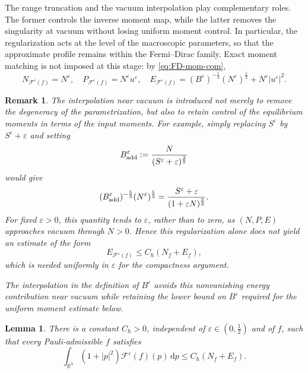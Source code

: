 \documentclass[10pt,reqno]{amsart}
\numberwithin{equation}{section}
\newtheorem{lemma}{Lemma}[section]
\newtheorem{remark}{Remark}[section]
\theoremstyle{definition}
\newcommand{\R}{\mathbb R}
\newcommand{\dpp}{\mathrm{d}p}
\newcommand{\be}{B^{\varepsilon}}
\newcommand{\e}{\varepsilon}
\newcommand{\calF}{\mathcal F}
\newcommand{\bq}{\begin{equation}}
\newcommand{\eq}{\end{equation}}
\begin{document}
The range truncation and the vacuum interpolation play complementary roles. The former controls the inverse moment map, while the latter removes the singularity at vacuum without losing uniform moment control. In particular, the regularization acts at the level of the macroscopic parameters, so that the approximate profile remains within the Fermi--Dirac family. Exact moment matching is not imposed at this stage: by \eqref{eq:FD-mom-com},
\bq \label{eq:Feps-mom}
 N_{\calF^\e(f)}=N^\e,\quad  P_{\calF^\e(f)}=N^\e u^\e,\quad  E_{\calF^\e(f)}=(\be)^{-\frac53}(N^\e)^{\frac53}  +N^\e|u^\e|^2.
\eq


\begin{remark} 
The interpolation near vacuum is introduced not merely to remove the degeneracy of the parametrization, but also to retain control of the equilibrium moments in terms of the input moments. For example, simply replacing $S^\e$ by $S^\e+\e$ and setting
\[
 B_{\rm add}^\e:=\frac{N}{(S^\e+\e)^{\frac35}}
\]
would give
\[
 (B_{\rm add}^\e)^{-\frac53}(N^\e)^{\frac53}
 =
 \frac{S^\e+\e}{(1+\e N)^{\frac53}}.
\]
For fixed $\e>0$, this quantity tends to $\e$, rather than to zero, as $(N,P,E)$ approaches vacuum through $N>0$. Hence this regularization alone does not yield an estimate of the form
\[
 E_{\calF^\e(f)}\le C_\hbar(N_f+E_f),
\]
which is needed uniformly in $\e$ for the compactness argument.

The interpolation in the definition of $B^\e$ avoids this nonvanishing energy contribution near vacuum while retaining the lower bound on $B^\e$ required for the uniform moment estimate below.
\end{remark}


\begin{lemma}\label{lem:unif-e}
There is a constant $C_\hbar>0$, independent of $\e\in(0,\frac12)$ and of $f$, such that every Pauli-admissible $f$ satisfies
\[
 \int_{\R^3}(1+|p|^2)\calF^\e(f)(p)\,\dpp  \leq C_\hbar(N_f+E_f).
\]
\end{lemma}
\end{document}
